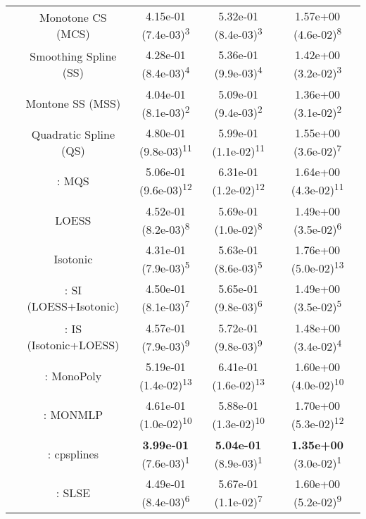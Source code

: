 \begin{tabular}{ccccc}
&Monotone CS (MCS)& 4.15e-01 (7.4e-03)\textsuperscript{3}& 5.32e-01 (8.4e-03)\textsuperscript{3}& 1.57e+00 (4.6e-02)\textsuperscript{8}\tabularnewline
&Smoothing Spline (SS)& 4.28e-01 (8.4e-03)\textsuperscript{4}& 5.36e-01 (9.9e-03)\textsuperscript{4}& 1.42e+00 (3.2e-02)\textsuperscript{3}\tabularnewline
&Montone SS (MSS)& 4.04e-01 (8.1e-03)\textsuperscript{2}& 5.09e-01 (9.4e-03)\textsuperscript{2}& 1.36e+00 (3.1e-02)\textsuperscript{2}\tabularnewline
&Quadratic Spline (QS)& 4.80e-01 (9.8e-03)\textsuperscript{11}& 5.99e-01 (1.1e-02)\textsuperscript{11}& 1.55e+00 (3.6e-02)\textsuperscript{7}\tabularnewline
&\textcite{heMonotoneBsplineSmoothing1998}: MQS& 5.06e-01 (9.6e-03)\textsuperscript{12}& 6.31e-01 (1.2e-02)\textsuperscript{12}& 1.64e+00 (4.3e-02)\textsuperscript{11}\tabularnewline
&LOESS& 4.52e-01 (8.2e-03)\textsuperscript{8}& 5.69e-01 (1.0e-02)\textsuperscript{8}& 1.49e+00 (3.5e-02)\textsuperscript{6}\tabularnewline
&Isotonic& 4.31e-01 (7.9e-03)\textsuperscript{5}& 5.63e-01 (8.6e-03)\textsuperscript{5}& 1.76e+00 (5.0e-02)\textsuperscript{13}\tabularnewline
&\textcite{mammenEstimatingSmoothMonotone1991}: SI (LOESS+Isotonic)& 4.50e-01 (8.1e-03)\textsuperscript{7}& 5.65e-01 (9.8e-03)\textsuperscript{6}& 1.49e+00 (3.5e-02)\textsuperscript{5}\tabularnewline
&\textcite{mammenEstimatingSmoothMonotone1991}: IS (Isotonic+LOESS)& 4.57e-01 (7.9e-03)\textsuperscript{9}& 5.72e-01 (9.8e-03)\textsuperscript{9}& 1.48e+00 (3.4e-02)\textsuperscript{4}\tabularnewline
&\textcite{murrayFastFlexibleMethods2016a}: MonoPoly& 5.19e-01 (1.4e-02)\textsuperscript{13}& 6.41e-01 (1.6e-02)\textsuperscript{13}& 1.60e+00 (4.0e-02)\textsuperscript{10}\tabularnewline
&\textcite{cannonMonmlpMultilayerPerceptron2017}: MONMLP& 4.61e-01 (1.0e-02)\textsuperscript{10}& 5.88e-01 (1.3e-02)\textsuperscript{10}& 1.70e+00 (5.3e-02)\textsuperscript{12}\tabularnewline
&\textcite{navarro-garciaConstrainedSmoothingOutofrange2023}: cpsplines& \textbf{3.99e-01} (7.6e-03)\textsuperscript{1}& \textbf{5.04e-01} (8.9e-03)\textsuperscript{1}& \textbf{1.35e+00} (3.0e-02)\textsuperscript{1}\tabularnewline
&\textcite{groeneboomConfidenceIntervalsMonotone2023}: SLSE& 4.49e-01 (8.4e-03)\textsuperscript{6}& 5.67e-01 (1.1e-02)\textsuperscript{7}& 1.60e+00 (5.2e-02)\textsuperscript{9}\tabularnewline
\bottomrule
\end{tabular}
